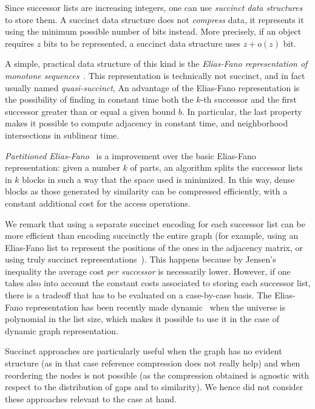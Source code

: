 Since successor lists are increasing integers, one can use \emph{succinct data
  structures}~\cite{NavCDS} to store them. A succinct data structure does not
\emph{compress} data, it represents it using the minimum possible number of
bits instead.
More precisely, if an object requires $z$ bits to be represented, a succinct
data structure uses $z+o(z)$ bit.

A simple, practical data structure of this kind is the \emph{Elias-Fano
representation of monotone sequences}~\cite{EliESRCASF}. This representation
is technically not succinct, and in fact usually named \emph{quasi-succinct},
An advantage of the
Elias-Fano representation is the possibility of finding in constant time both
the $k$-th successor and the first successor greater than or equal a
given bound $b$. In particular, the last property makes it possible to compute
adjacency in constant time, and neighborhood intersections in sublinear time.

\emph{Partitioned Elias-Fano}~\cite{OtVPEFI} is a improvement over the basic
Elias-Fano representation: given a number $k$ of parts, an algorithm splits
the successor lists in $k$ blocks in such a way that the space used is
minimized. In this way, dense blocks as those generated by similarity can be
compressed efficiently, with a constant additional cost for the access
operations.

We remark that using a separate succinct encoding for each successor list can
be more efficient than encoding succinctly the entire graph (for example, using
an Elias-Fano list to represent the positions of the ones in the adjacency
matrix, or using truly succinct representations~\cite{FaMSEAG}). This happens
because by Jensen's inequality the average cost \emph{per successor} is
necessarily lower.  However, if one takes also into account the constant costs
associated to storing each successor list, there is a tradeoff that has to be
evaluated on a case-by-case basis.  The Elias-Fano representation has been
recently made dynamic~\cite{PiVDEFR} when the universe is polynomial in the
list size, which makes it possible to use it in the case of dynamic graph
representation.

Succinct approaches are particularly useful when the graph has no evident
structure (as in that case reference compression does not really help) and when
reordering the nodes is not possible (as the compression obtained is agnostic
with respect to the distribution of gaps and to similarity). We hence did not
consider these approaches relevant to the case at hand.
